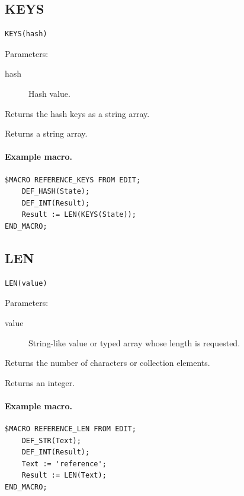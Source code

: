 \documentclass[a4paper,10pt,twoside,openany]{book}
\newenvironment{mrmacextension}{\begin{changebar}}{\end{changebar}}
\begin{document}
\begin{mrmacextension}
\label{prim:intrinsic-keys}
\subsection*{KEYS}
\begin{verbatim}
KEYS(hash)
\end{verbatim}
Parameters:
\begin{description}
\item[hash] Hash value.
\end{description}

Returns the hash keys as a string array.

Returns a string array.

\paragraph{Example macro.}
\begin{verbatim}
$MACRO REFERENCE_KEYS FROM EDIT;
    DEF_HASH(State);
    DEF_INT(Result);
    Result := LEN(KEYS(State));
END_MACRO;
\end{verbatim}
\end{mrmacextension}

\begin{mrmacextension}
\label{prim:intrinsic-len}
\subsection*{LEN}
\begin{verbatim}
LEN(value)
\end{verbatim}
Parameters:
\begin{description}
\item[value] String-like value or typed array whose length is requested.
\end{description}

Returns the number of characters or collection elements.

Returns an integer.

\paragraph{Example macro.}
\begin{verbatim}
$MACRO REFERENCE_LEN FROM EDIT;
    DEF_STR(Text);
    DEF_INT(Result);
    Text := 'reference';
    Result := LEN(Text);
END_MACRO;
\end{verbatim}
\end{mrmacextension}
\end{document}
